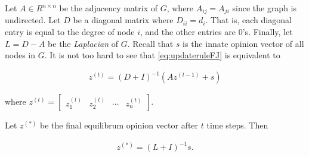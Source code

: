 Let $A \in R^{n \times n}$ be the adjacency matrix of $G$, where $A_{ij} = A_{ji}$ since the graph is undirected. Let $D$ be a diagonal matrix where $D_{ii} = d_i$. That is, each diagonal entry is equal to the degree of node $i$, and the other entries are 0's. Finally, let $L = D - A$ be the \emph{Laplacian} of $G$. Recall that ${s}$ is the innate opinion vector of all nodes in $G$.
It is not too hard to see that \cref{eq:updateruleFJ} is equivalent to

\begin{align}\label{updaterulelinalg}
    {z}^{(t)} = (D + I)^{-1}(A{z}^{(t-1)} + {s})
\end{align}

where $ {z}^{(t)} = \begin{bmatrix} z_1^{(t)} & z_2^{(t)} & \cdots & z_n^{(t)} \end{bmatrix}$. 

Let ${z}^{(*)}$ be the final equilibrum opinion vector after $t$ time steps. Then 

\begin{align}\label{zstar}
    {z}^{(*)} = (L + I)^{-1}{s}.
\end{align}

